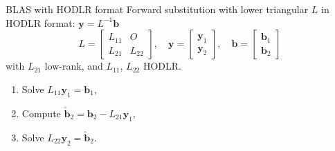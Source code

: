 \documentclass[aspectratio=169,xcolor=dvipsnames]{beamer}
\begin{document}
\begin{frame}{BLAS with HODLR format}
Forward substitution with lower triangular $L$ in HODLR format: $\mathbf{y} = L^{-1}\mathbf{b}$
\[
L = \begin{bmatrix}
	L_{11} & O \\
	L_{21} & L_{22}
\end{bmatrix}, \quad \mathbf{y} = \begin{bmatrix}
\mathbf{y}_1 \\
\mathbf{y}_2
\end{bmatrix}, \quad \mathbf{b} = \begin{bmatrix}
\mathbf{b}_1 \\
\mathbf{b}_2
\end{bmatrix}
\]
with $L_{21}$ low-rank, and $L_{11}$, $L_{22}$ HODLR.
\begin{enumerate}
	\item<2-> Solve $L_{11}\mathbf{y}_1 = \mathbf{b}_1$,
	\item<3-> Compute $\tilde{\mathbf{b}}_2 = \mathbf{b}_2 - L_{21}\mathbf{y}_1$,
	\item<4-> Solve $L_{22}\mathbf{y}_2 = \tilde{\mathbf{b}}_2$.
\end{enumerate}


\end{frame}
\end{document}
